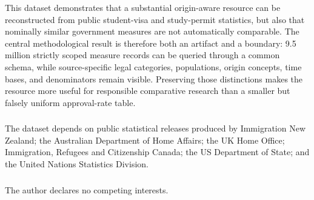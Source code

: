 \documentclass[runningheads]{llncs}
\begin{document}
This dataset demonstrates that a substantial origin-aware resource can be reconstructed from public student-visa and study-permit statistics, but also that nominally similar government measures are not automatically comparable. The central methodological result is therefore both an artifact and a boundary: 9.5 million strictly scoped measure records can be queried through a common schema, while source-specific legal categories, populations, origin concepts, time bases, and denominators remain visible. Preserving those distinctions makes the resource more useful for responsible comparative research than a smaller but falsely uniform approval-rate table.

\begin{credits}
\subsubsection{\ackname}
The dataset depends on public statistical releases produced by Immigration New Zealand; the Australian Department of Home Affairs; the UK Home Office; Immigration, Refugees and Citizenship Canada; the US Department of State; and the United Nations Statistics Division.

\subsubsection{\discintname}
The author declares no competing interests.
\end{credits}


\end{document}
